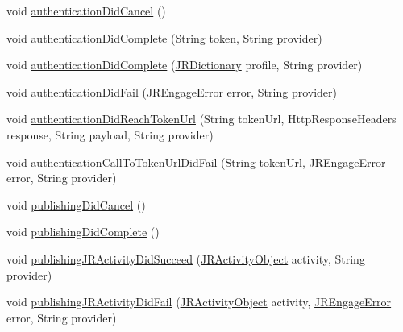 \begin{DoxyCompactItemize}
\item 
void \hyperlink{interfacecom_1_1janrain_1_1android_1_1engage_1_1session_1_1_j_r_session_delegate_aa06c291fb87c3b103854bc39c9b55399}{authenticationDidCancel} ()
\item 
void \hyperlink{interfacecom_1_1janrain_1_1android_1_1engage_1_1session_1_1_j_r_session_delegate_a71084326de845a98c8facb5a03eeb314}{authenticationDidComplete} (String token, String provider)
\item 
void \hyperlink{interfacecom_1_1janrain_1_1android_1_1engage_1_1session_1_1_j_r_session_delegate_a1e4d214144e986b86a24a16289c58234}{authenticationDidComplete} (\hyperlink{classcom_1_1janrain_1_1android_1_1engage_1_1types_1_1_j_r_dictionary}{JRDictionary} profile, String provider)
\item 
void \hyperlink{interfacecom_1_1janrain_1_1android_1_1engage_1_1session_1_1_j_r_session_delegate_a5f04eee2bc9d726b268513f87ee199d1}{authenticationDidFail} (\hyperlink{classcom_1_1janrain_1_1android_1_1engage_1_1_j_r_engage_error}{JREngageError} error, String provider)
\item 
void \hyperlink{interfacecom_1_1janrain_1_1android_1_1engage_1_1session_1_1_j_r_session_delegate_a5eb20b3f3aa6ed9fa2a27c126d1f2116}{authenticationDidReachTokenUrl} (String tokenUrl, HttpResponseHeaders response, String payload, String provider)
\item 
void \hyperlink{interfacecom_1_1janrain_1_1android_1_1engage_1_1session_1_1_j_r_session_delegate_ae9caea9cf8e4f56a178fa934e42462bb}{authenticationCallToTokenUrlDidFail} (String tokenUrl, \hyperlink{classcom_1_1janrain_1_1android_1_1engage_1_1_j_r_engage_error}{JREngageError} error, String provider)
\item 
void \hyperlink{interfacecom_1_1janrain_1_1android_1_1engage_1_1session_1_1_j_r_session_delegate_aaadcbca515d8041904341a81a9c33a8e}{publishingDidCancel} ()
\item 
void \hyperlink{interfacecom_1_1janrain_1_1android_1_1engage_1_1session_1_1_j_r_session_delegate_afd57dbe6522f5546b246a2bcc1f6ed2b}{publishingDidComplete} ()
\item 
void \hyperlink{interfacecom_1_1janrain_1_1android_1_1engage_1_1session_1_1_j_r_session_delegate_a2d2f156ec8f5e0ff5e34fcdd3d28867d}{publishingJRActivityDidSucceed} (\hyperlink{classcom_1_1janrain_1_1android_1_1engage_1_1types_1_1_j_r_activity_object}{JRActivityObject} activity, String provider)
\item 
void \hyperlink{interfacecom_1_1janrain_1_1android_1_1engage_1_1session_1_1_j_r_session_delegate_a31e641b132e1aec41de32ff9e8394c13}{publishingJRActivityDidFail} (\hyperlink{classcom_1_1janrain_1_1android_1_1engage_1_1types_1_1_j_r_activity_object}{JRActivityObject} activity, \hyperlink{classcom_1_1janrain_1_1android_1_1engage_1_1_j_r_engage_error}{JREngageError} error, String provider)

\end{DoxyCompactItemize}
